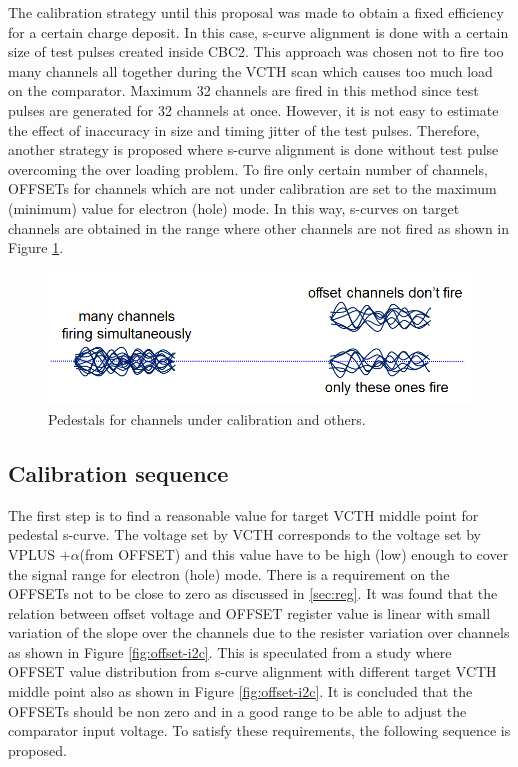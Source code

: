 \documentclass[11pt,a4paper]{article}
\begin{document}
	The calibration strategy until this proposal was made to obtain a fixed efficiency for a certain charge deposit. 
	In this case, s-curve alignment is done with a certain size of 
	test pulses created inside CBC2.  This approach was chosen not to fire too many channels all together during
	the VCTH scan which causes too much load on the comparator.  Maximum 32 channels are fired in this method since test pulses are generated
	for 32 channels at once.
	However, it is not easy to estimate the effect of inaccuracy in size and timing jitter of the test pulses.
	Therefore, another strategy is proposed where s-curve alignment is done without test pulse overcoming the over loading problem. 
To fire only certain number of channels, OFFSETs for channels which are not under calibration are set to the maximum (minimum) value for electron (hole)
	mode.  In this way, s-curves on target channels are obtained in the range where other channels are not fired as shown in Figure \ref{fig:pedestals}.

	\begin{figure}[htbp]
	\centering
	\includegraphics[width=\textwidth]{fig/pedestals.png}
	\caption{Pedestals for channels under calibration and others. }\label{fig:pedestals}
	\end{figure}

	\subsection{Calibration sequence}\label{subsec:calib-sequence}

	The first step is to find a reasonable value for target VCTH middle point for pedestal s-curve.  
The voltage set by VCTH corresponds to the voltage set by VPLUS $+\alpha$(from OFFSET) 
	and this value have to be high (low) enough to cover the signal range for electron (hole) mode.
	There is a requirement on the OFFSETs not to be close to zero as discussed in \ref{sec:reg}. 
	It was found that the relation between offset voltage and OFFSET register value is 
	linear with small variation of the slope over the channels due to the resister variation over channels as shown in Figure \ref{fig:offset-i2c}.
	This is speculated from a study where OFFSET value distribution from s-curve alignment with different target VCTH middle point
	also as shown in Figure \ref{fig:offset-i2c}. It is concluded that the OFFSETs should be non zero and in a good range to be able 
	to adjust the comparator input voltage. To satisfy these requirements, the following sequence is proposed. 
\end{document}
